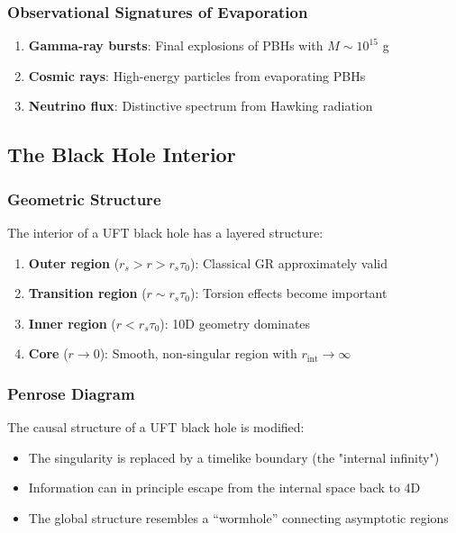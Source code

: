 \subsubsection{Observational Signatures of Evaporation}

\begin{enumerate}
    \item \textbf{Gamma-ray bursts}: Final explosions of PBHs with $M \sim 10^{15}$ g
    \item \textbf{Cosmic rays}: High-energy particles from evaporating PBHs
    \item \textbf{Neutrino flux}: Distinctive spectrum from Hawking radiation
\end{enumerate}

\subsection{The Black Hole Interior}

\subsubsection{Geometric Structure}

The interior of a UFT black hole has a layered structure:

\begin{enumerate}
    \item \textbf{Outer region} ($r_s > r > r_s\tau_0$): Classical GR approximately valid
    \item \textbf{Transition region} ($r \sim r_s\tau_0$): Torsion effects become important
    \item \textbf{Inner region} ($r < r_s\tau_0$): 10D geometry dominates
    \item \textbf{Core} ($r \to 0$): Smooth, non-singular region with $r_{\text{int}} \to \infty$
\end{enumerate}

\subsubsection{Penrose Diagram}

The causal structure of a UFT black hole is modified:
\begin{itemize}
    \item The singularity is replaced by a timelike boundary (the "internal infinity")
    \item Information can in principle escape from the internal space back to 4D
    \item The global structure resembles a ``wormhole'' connecting asymptotic regions
\end{itemize}

